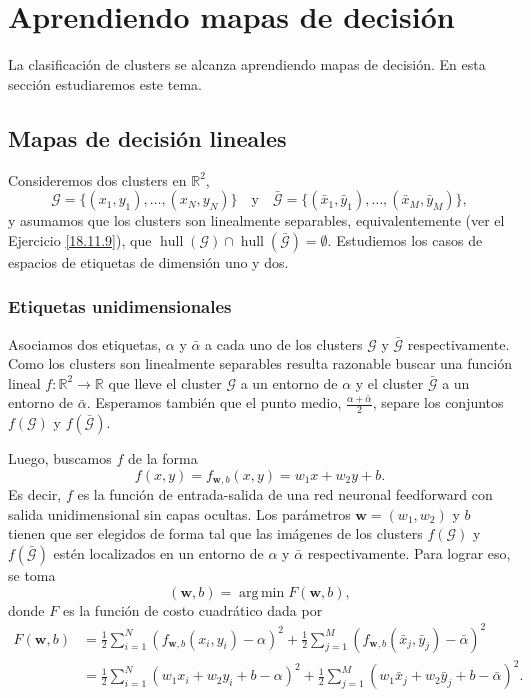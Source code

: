 \documentclass[12pt, a4paper]{amsbook}
\def\hull{\operatorname {\mathrm{hull}}}
\def\argmin{\operatorname {\mathrm{arg\, min}}}
\newcommand{\R}{{\mathbb R}}
\newcommand{\G}{{\mathcal G}}
\newcommand{\ww}{{\mathbf w}}
\theoremstyle{remark}
\theoremstyle{definition}
\numberwithin{section}{chapter}
\numberwithin{subsection}{section}
\numberwithin{equation}{section}
\numberwithin{figure}{chapter}
\begin{document}
\section{Aprendiendo mapas de decisión}\label{sec.c10.8}

La clasificación de clusters se alcanza aprendiendo mapas de decisión. En esta sección estudiaremos este tema.

\subsection{Mapas de decisión lineales}

Consideremos dos clusters en $\R^2$,
$$
\G = \{(x_1,y_1),\dots,(x_N, y_N)\} \quad \text{y}\quad \bar\G = \{(\bar x_1,\bar y_1),\dots,(\bar x_M, \bar y_M)\},
$$
y asumamos que los clusters son linealmente separables, equivalentemente (ver el Ejercicio \ref{18.11.9}), que $\hull(\G)\cap\hull(\bar\G)=\emptyset$. Estudiemos los casos de espacios de etiquetas de dimensión uno y dos.

\subsubsection*{Etiquetas unidimensionales} Asociamos dos etiquetas, $\alpha$ y $\bar\alpha$ a cada uno de los clusters $\G$ y $\bar\G$ respectivamente. Como los clusters son linealmente separables resulta razonable buscar una función lineal $f\colon\R^2\to\R$ que lleve el cluster $\G$ a un entorno de $\alpha$ y el cluster $\bar\G$ a un entorno de $\bar\alpha$. Esperamos también que el punto medio, $\frac{\alpha+\bar\alpha}{2}$, separe los conjuntos $f(\G)$ y $f(\bar\G)$.

Luego, buscamos $f$ de la forma
$$
f(x,y)=f_{\ww, b}(x, y) = w_1 x + w_2 y + b.
$$
Es decir, $f$ es la función de entrada-salida de una red neuronal feedforward con salida unidimensional sin capas ocultas. Los parámetros $\ww=(w_1, w_2)$ y $b$ tienen que ser elegidos de forma tal que las imágenes de los clusters $f(\G)$ y $f(\bar\G)$ estén localizados en un entorno de $\alpha$ y $\bar\alpha$ respectivamente. Para lograr eso, se toma
$$
(\ww, b) = \argmin F(\ww, b),
$$
donde $F$ es la función de costo cuadrático dada por
\begin{align*}
F(\ww, b) &= \frac12 \sum_{i=1}^N (f_{\ww, b}(x_i, y_i)-\alpha)^2 + \frac12 \sum_{j=1}^M (f_{\ww, b}(\bar x_j, \bar y_j)-\bar\alpha)^2\\
&= \frac12 \sum_{i=1}^N (w_1 x_i + w_2 y_i + b - \alpha)^2 + \frac12 \sum_{j=1}^M (w_1 \bar x_j + w_2 \bar y_j + b-\bar\alpha)^2.
\end{align*}
\end{document}
